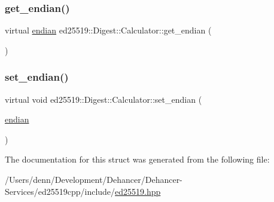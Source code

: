\subsubsection{\texorpdfstring{get\+\_\+endian()}{get\_endian()}}
{\footnotesize\ttfamily virtual \mbox{\hyperlink{structed25519_1_1_digest_1_1_calculator_a9bbea874787f93cdf4841b30c1c0d9a3}{endian}} ed25519\+::\+Digest\+::\+Calculator\+::get\+\_\+endian (\begin{DoxyParamCaption}{ }\end{DoxyParamCaption})\hspace{0.3cm}{\ttfamily [pure virtual]}}

\mbox{\label{structed25519_1_1_digest_1_1_calculator_a2e5de160d53feaef2ce5c0240e8e13ea}} 
\subsubsection{\texorpdfstring{set\+\_\+endian()}{set\_endian()}}
{\footnotesize\ttfamily virtual void ed25519\+::\+Digest\+::\+Calculator\+::set\+\_\+endian (\begin{DoxyParamCaption}\item[{\mbox{\hyperlink{structed25519_1_1_digest_1_1_calculator_a9bbea874787f93cdf4841b30c1c0d9a3}{endian}}}]{ }\end{DoxyParamCaption})\hspace{0.3cm}{\ttfamily [pure virtual]}}



The documentation for this struct was generated from the following file\+:\begin{DoxyCompactItemize}
\item 
/\+Users/denn/\+Development/\+Dehancer/\+Dehancer-\/\+Services/ed25519cpp/include/\mbox{\hyperlink{ed25519_8hpp}{ed25519.\+hpp}}\end{DoxyCompactItemize}
